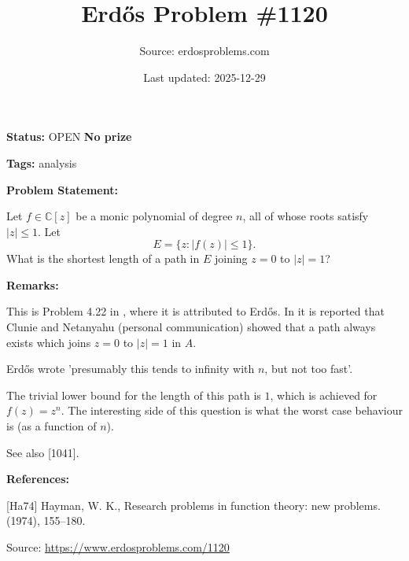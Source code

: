 \documentclass{article}
\title{Erd\H{o}s Problem \#1120}
\date{Last updated: 2025-12-29}
\author{Source: erdosproblems.com}
\begin{document}
\maketitle

\noindent\textbf{Status:} OPEN \quad \textbf{No prize}

\noindent\textbf{Tags:} analysis

\medskip
\noindent\textbf{Problem Statement:}

Let $f\in \mathbb{C}[z]$ be a monic polynomial of degree $n$, all of whose roots satisfy $\lvert z\rvert\leq 1$. Let\[E= \{ z : \lvert f(z)\rvert \leq 1\}.\]What is the shortest length of a path in $E$ joining $z=0$ to $\lvert z\rvert =1$?

\bigskip
\noindent\textbf{Remarks:}

This is Problem 4.22 in \cite{Ha74}, where it is attributed to Erd\H{o}s. In \cite{Ha74} it is reported that Clunie and Netanyahu (personal communication) showed that a path always exists which joins $z=0$ to $\lvert z\rvert=1$ in $A$.

Erd\H{o}s wrote 'presumably this tends to infinity with $n$, but not too fast'.

The trivial lower bound for the length of this path is $1$, which is achieved for $f(z)=z^n$. The interesting side of this question is what the worst case behaviour is (as a function of $n$).

See also [1041].

\bigskip
\noindent\textbf{References:}

[Ha74] Hayman, W. K., Research problems in function theory: new problems. (1974), 155--180.

\bigskip
\noindent\small{Source: \url{https://www.erdosproblems.com/1120}}
\end{document}
